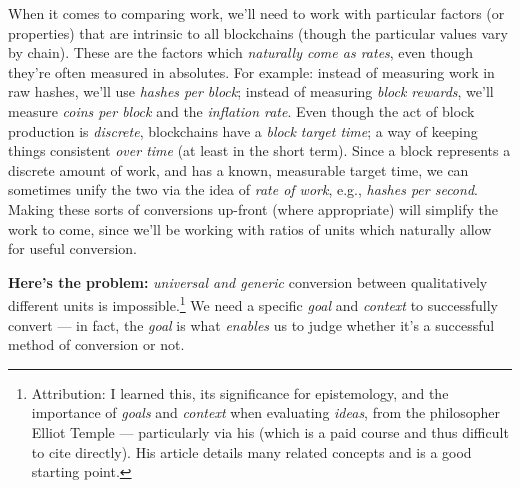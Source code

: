 When it comes to comparing work, we'll need to work with particular factors (or properties) that are intrinsic to all blockchains (though the particular values vary by chain).
These are the factors which \emph{naturally come as rates}, even though they're often measured in absolutes.
For example: instead of measuring work in raw hashes, we'll use \emph{hashes per block};
instead of measuring \emph{block rewards}, we'll measure \emph{coins per block} and the \emph{inflation rate}.
Even though the act of block production is \emph{discrete}, blockchains have a \emph{block target time}; a way of keeping things consistent \emph{over time} (at least in the short term).
Since a block represents a discrete amount of work, and has a known, measurable target time, we can sometimes unify the two via the idea of \emph{rate of work}, e.g., \emph{hashes per second}.
Making these sorts of conversions up-front (where appropriate) will simplify the work to come, since we'll be working with ratios of units which naturally allow for useful conversion.


\textbf{Here's the problem:} \emph{universal and generic} conversion between qualitatively different units is impossible.\footnote{
    Attribution: I learned this, its significance for epistemology, and the importance of \emph{goals} and \emph{context} when evaluating \emph{ideas}, from the philosopher Elliot Temple --- particularly via his \citeCriticalFallibilismCourse{} (which is a paid course and thus difficult to cite directly).
    His article \citeMultiFactorDecisionLink{} details many related concepts and is a good starting point.
}
We need a specific \emph{goal} and \emph{context} to successfully convert --- in fact, the \emph{goal} is what \emph{enables} us to judge whether it's a successful method of conversion or not.


